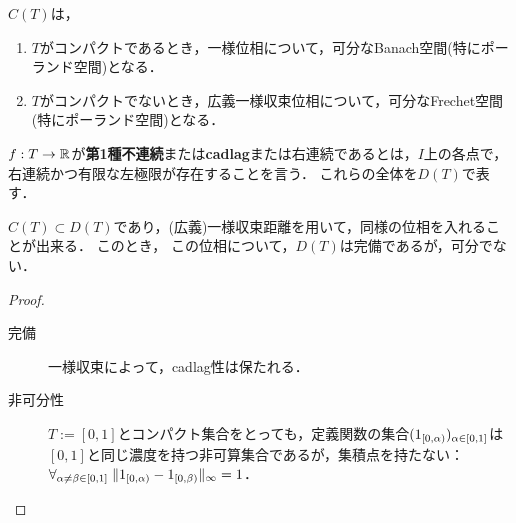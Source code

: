 \documentclass[uplatex,dvipdfmx]{jsreport}
\begin{document}
\begin{theorem}
    $C(T)$は，
    \begin{enumerate}
        \item $T$がコンパクトであるとき，一様位相について，可分なBanach空間(特にポーランド空間)となる．
        \item $T$がコンパクトでないとき，広義一様収束位相について，可分なFrechet空間(特にポーランド空間)となる．
    \end{enumerate}
\end{theorem}

\begin{definition}
    $f:T\to\mathbb{R}$が\textbf{第1種不連続}または\textbf{cadlag}または右連続であるとは，$I$上の各点で，右連続かつ有限な左極限が存在することを言う．
    これらの全体を$D(T)$で表す．
\end{definition}

\begin{lemma}
    $C(T)\subset D(T)$であり，(広義)一様収束距離を用いて，同様の位相を入れることが出来る．
    このとき，
    この位相について，$D(T)$は完備であるが，可分でない．
\end{lemma}
\begin{proof}\mbox{}
    \begin{description}
        \item[完備] 一様収束によって，cadlag性は保たれる．
        \item[非可分性] $T:=[0,1]$とコンパクト集合をとっても，定義関数の集合$(1_{[0,\alpha)})_{\alpha\in[0,1]}$は$[0,1]$と同じ濃度を持つ非可算集合であるが，集積点を持たない：$\forall_{\alpha\ne\beta\in[0,1]}\;\|1_{[0,\alpha)}-1_{[0,\beta)}\|_\infty=1$．
    \end{description}
\end{proof}
\end{document}
